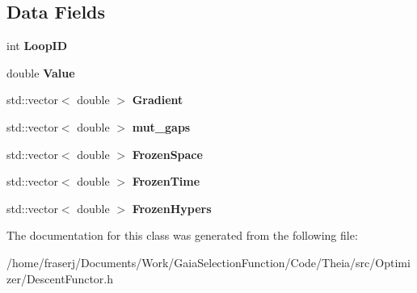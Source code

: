 \subsection*{Data Fields}
\begin{DoxyCompactItemize}
\item 
\mbox{\label{classDescentFunctor_a14a7ae0eb78ad3a56a289ee300119104}} 
int {\bfseries Loop\+ID}
\item 
\mbox{\label{classDescentFunctor_a09bd6f8a2558a7530486ae0605f44983}} 
double {\bfseries Value}
\item 
\mbox{\label{classDescentFunctor_acb32f6b34a3eb2d0ebf170a674ab1c02}} 
std\+::vector$<$ double $>$ {\bfseries Gradient}
\item 
\mbox{\label{classDescentFunctor_a424da8de442d996ae9062bbedbcd7868}} 
std\+::vector$<$ double $>$ {\bfseries mut\+\_\+gaps}
\item 
\mbox{\label{classDescentFunctor_a80f4fb498c367c3bf9752163cb13f8f5}} 
std\+::vector$<$ double $>$ {\bfseries Frozen\+Space}
\item 
\mbox{\label{classDescentFunctor_a2bddad96900bc85af34e773c092c257f}} 
std\+::vector$<$ double $>$ {\bfseries Frozen\+Time}
\item 
\mbox{\label{classDescentFunctor_a8d0f68c56e365aa9d2a6804ea2627de8}} 
std\+::vector$<$ double $>$ {\bfseries Frozen\+Hypers}
\end{DoxyCompactItemize}


The documentation for this class was generated from the following file\+:\begin{DoxyCompactItemize}
\item 
/home/fraserj/\+Documents/\+Work/\+Gaia\+Selection\+Function/\+Code/\+Theia/src/\+Optimizer/Descent\+Functor.\+h\end{DoxyCompactItemize}
